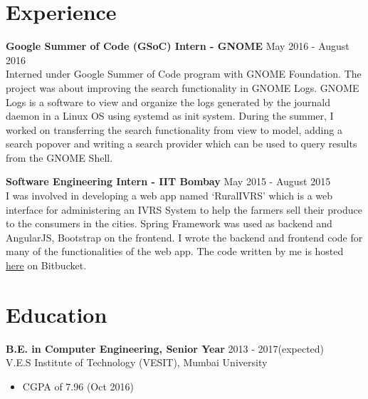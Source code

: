 \documentclass[12pt,margin, centered]{res}
\begin{document}
\begin{resume}



\section{Experience}
\vspace{10mm}
\textbf{Google Summer of Code (GSoC) Intern - GNOME} \hfill May 2016 - August 2016\\
Interned under Google Summer of Code program with GNOME Foundation. The project was about improving the search functionality in GNOME Logs. GNOME Logs is a software to view and organize the logs generated by the journald daemon in a Linux OS using systemd as init system. During the summer, I worked on transferring the search functionality from view to model, adding a search popover and writing a search provider which can be used to query results from the GNOME Shell.

\vspace{2mm}

\textbf{Software Engineering Intern - IIT Bombay} \hfill May 2015 - August 2015\\
I was involved in developing a web app named ‘RuralIVRS’ which is a web interface for administering an IVRS System to help the farmers sell their produce to the consumers in the cities. Spring Framework was used as backend and AngularJS, Bootstrap on the frontend. I wrote the backend and frontend code for many of the functionalities of the web app. The code written by me is hosted \href{https://bitbucket.org/pranavg189/ruralict}{here} on Bitbucket.



\section{Education}
\vspace{10mm}
\textbf{B.E. in Computer Engineering, Senior Year} \hfill 2013 - 2017(expected) \\
V.E.S Institute of Technology (VESIT), Mumbai University
\begin{itemize}
 \item CGPA of 7.96 (Oct 2016)
\end{itemize}


\end{resume}
\end{document}
